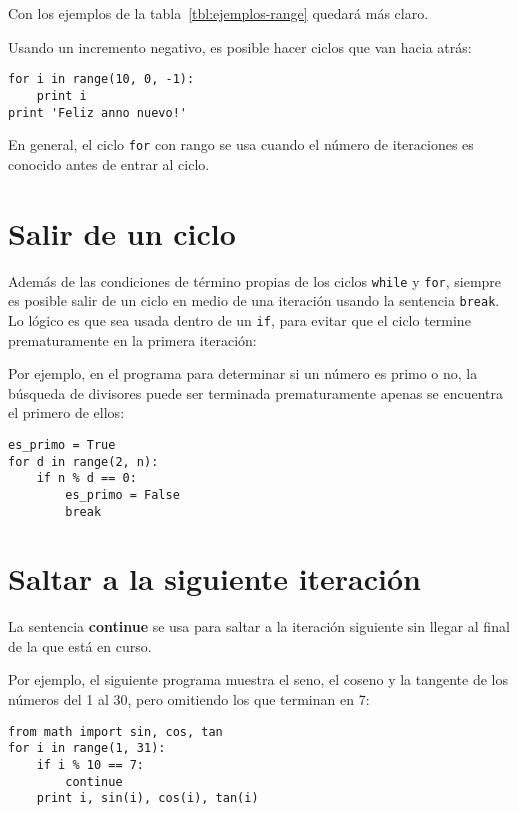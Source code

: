 Con los ejemplos de la tabla~\ref{tbl:ejemplos-range} quedará más claro.

Usando un incremento negativo, es posible hacer ciclos que van hacia
atrás:

\begin{lstlisting}
for i in range(10, 0, -1):
    print i
print 'Feliz anno nuevo!'
\end{lstlisting}

En general, el ciclo \lstinline!for! con rango se usa cuando el número
de iteraciones es conocido antes de entrar al ciclo.

\section{Salir de un ciclo}

Además de las condiciones de término propias de los ciclos
\lstinline!while! y \lstinline!for!, siempre es posible salir de un
ciclo en medio de una iteración usando la sentencia \lstinline!break!. Lo
lógico es que sea usada dentro de un \lstinline!if!, para evitar que el
ciclo termine prematuramente en la primera iteración:

\begin{center}
  
\end{center}

Por ejemplo, en el programa para determinar si un número es primo o no,
la búsqueda de divisores puede ser terminada prematuramente apenas se
encuentra el primero de ellos:

\begin{lstlisting}
es_primo = True
for d in range(2, n):
    if n % d == 0:
        es_primo = False
        break
\end{lstlisting}

\section{Saltar a la siguiente iteración}

La sentencia \textbf{continue} se usa para saltar a la iteración
siguiente sin llegar al final de la que está en curso.

\begin{center}
  
\end{center}

Por ejemplo, el siguiente programa muestra el seno, el coseno y la
tangente de los números del 1 al 30, pero omitiendo los que terminan en
7:

\begin{lstlisting}
from math import sin, cos, tan
for i in range(1, 31):
    if i % 10 == 7:
        continue
    print i, sin(i), cos(i), tan(i)
\end{lstlisting}

